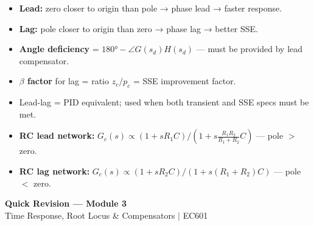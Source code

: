 \documentclass[12pt,a4paper]{article}
\begin{document}
\begin{tcolorbox}[exambox, title={Exam Tips — Compensators}]
\begin{itemize}[leftmargin=*, itemsep=3pt, topsep=0pt]
  \item \textbf{Lead:} zero closer to origin than pole → phase lead → faster response.
  \item \textbf{Lag:} pole closer to origin than zero → phase lag → better SSE.
  \item \textbf{Angle deficiency} = $180° - \angle G(s_d)H(s_d)$ — must be provided by lead compensator.
  \item \textbf{$\beta$ factor} for lag = ratio $z_c/p_c$ = SSE improvement factor.
  \item Lead-lag = PID equivalent; used when both transient and SSE specs must be met.
  \item \textbf{RC lead network:} $G_c(s) \propto (1+sR_1C)/(1+s\frac{R_1R_2}{R_1+R_2}C)$ — pole $>$ zero.
  \item \textbf{RC lag network:} $G_c(s) \propto (1+sR_2C)/(1+s(R_1+R_2)C)$ — pole $<$ zero.
\end{itemize}
\end{tcolorbox}

\newpage
\begin{center}
  {\large\bfseries\color{myred} Quick Revision — Module 3}\\[3pt]
  {\small\color{mydark} Time Response, Root Locus \& Compensators $|$ EC601}
\end{center}
\noindent{\color{myred}\rule{\linewidth}{1.2pt}}
\vspace{4pt}
\end{document}
